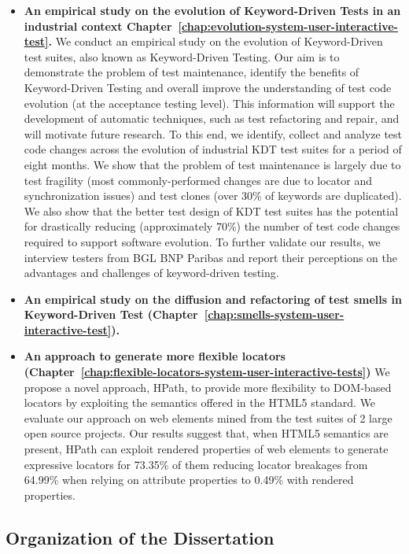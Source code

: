 \begin{itemize}
    \item \textbf{An empirical study on the evolution of Keyword-Driven Tests in an industrial context Chapter~\ref{chap:evolution-system-user-interactive-test}.} We conduct an empirical study on the evolution of  Keyword-Driven test suites, also known as Keyword-Driven Testing. Our aim is to demonstrate the problem of test maintenance, identify the benefits of Keyword-Driven Testing and overall improve the understanding of test code evolution (at the acceptance testing level). This information will support the development of automatic techniques, such as test refactoring and repair, and will motivate future research. To this end, we identify, collect and analyze test code changes across the evolution of industrial KDT test suites for a period of eight months. We show that the problem of test maintenance is largely due to test fragility (most commonly-performed changes are due to locator and synchronization issues) and test clones (over 30\% of keywords are duplicated). We also show that the better test design of KDT test suites has the potential for drastically reducing (approximately 70\%) the number of test code changes required to support software evolution. To further validate our results, we interview testers from BGL BNP Paribas and report their perceptions on the advantages and challenges of keyword-driven testing. 
    
    \item \textbf{An empirical study on the diffusion and refactoring of test smells in Keyword-Driven Test (Chapter~\ref{chap:smells-system-user-interactive-test}).}
    
    \item \textbf{An approach to generate more flexible locators (Chapter~\ref{chap:flexible-locators-system-user-interactive-tests})} We propose a novel approach, HPath, to provide more flexibility to DOM-based locators by exploiting the semantics offered in the HTML5 standard. We evaluate our approach on web elements mined from the test suites of 2 large open source projects. Our results suggest that, when HTML5 semantics are present, HPath can exploit rendered properties of web elements to generate expressive locators for 73.35\% of them reducing locator breakages from 64.99\% when relying on attribute properties to 0.49\% with rendered properties. 
\end{itemize}

\subsection{Organization of the Dissertation}


